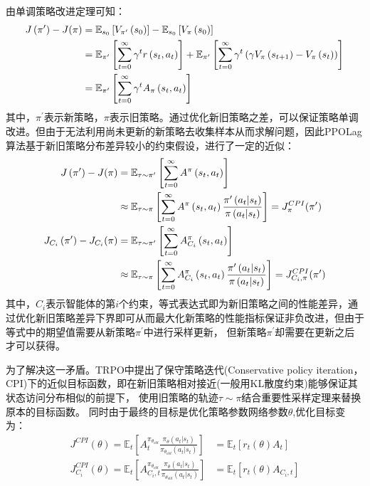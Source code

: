 由单调策略改进定理可知：
\begin{align}
    J\left(\pi^{\prime}\right)-J(\pi) & =\mathbb{E}_{s_{0}}\left[V_{\pi^{\prime}}\left(s_{0}\right)\right]-\mathbb{E}_{s_{0}}\left[V_{\pi}\left(s_{0}\right)\right] \\ \notag
    & =\mathbb{E}_{\pi^{\prime}}\left[\sum_{t=0}^{\infty} \gamma^{t} r\left(s_{t}, a_{t}\right)\right]+\mathbb{E}_{\pi^{\prime}}\left[\sum_{t=0}^{\infty} \gamma^{t}\left(\gamma V_{\pi}\left(s_{t+1}\right)-V_{\pi}\left(s_{t}\right)\right)\right] \\ \notag
    & = \mathbb{E}_{\pi^{\prime}}\left[\sum_{t=0}^{\infty} \gamma^{t} A_{\pi}\left(s_{t}, a_{t}\right)\right] \notag
\end{align}
其中，$\pi^{\prime}$表示新策略，$\pi$表示旧策略。通过优化新旧策略之差，可以保证策略单调改进。但由于无法利用尚未更新的新策略去收集样本从而求解问题，因此PPOLag算法基于新旧策略分布差异较小的约束假设，进行了一定的近似：
\begin{align}
    J\left(\pi^{\prime}\right)-J(\pi)
    &=  \mathbb{E}_{\tau \sim \pi^{\prime}}\left[\sum_{t=0}^{\infty} A^{\pi}\left(s_{t}, a_{t}\right) \right]\\ \notag
    &\approx \mathbb{E}_{\tau \sim \pi}\left[\sum_{t=0}^{\infty} A^{\pi}\left(s_{t}, a_{t}\right) \frac{\pi^{\prime}\left(a_{t}|s_{t}\right)}{\pi\left(a_{t}|s_{t}\right)}\right]=J_{\pi}^{CPI}(\pi^{\prime})\\
    J_{C_{i}}\left(\pi^{\prime}\right)-J_{C_{i}}(\pi)
    &=  \mathbb{E}_{\tau \sim \pi^{\prime}}\left[\sum_{t=0}^{\infty} A_{C_{i}}^{\pi}\left(s_{t}, a_{t}\right) \right]\\ \notag
    &\approx \mathbb{E}_{\tau \sim \pi}\left[\sum_{t=0}^{\infty} A_{C_{i}}^{\pi}\left(s_{t}, a_{t}\right) \frac{\pi^{\prime}\left(a_{t}|s_{t}\right)}{\pi\left(a_{t}|s_{t}\right)}\right]=J_{C_{i},\pi}^{CPI}(\pi^{\prime})
\end{align}
其中，$C_{i}$表示智能体的第$i$个约束，等式表达式即为新旧策略之间的性能差异，通过优化新旧策略差异下界即可从而最大化新策略的性能指标保证非负改进，但由于等式中的期望值需要从新策略$\pi^{\prime}$中进行采样更新，
但新策略$\pi^{\prime}$却需要在更新之后才可以获得。

为了解决这一矛盾。TRPO中提出了保守策略迭代(Conservative policy iteration，CPI)下的近似目标函数，即在新旧策略相对接近(一般用KL散度约束)能够保证其状态访问分布相似的前提下，
使用旧策略的轨迹$\tau \sim \pi$结合重要性采样定理来替换原本的目标函数。
同时由于最终的目标是优化策略参数网络参数$\theta$,优化目标变为：
\begin{align}
    J^{CPI}(\theta) = \mathbb{E}_{t}\left[ A_{t}^{\pi_{\theta_{old}}} \frac{\pi_{\theta}\left(a_{t}|s_{t}\right)}{\pi_{\theta_{old}}\left(a_{t}|s_{t}\right)}\right] & = \mathbb{E}_{t}\left[r_{t}(\theta)A_{t}\right]\\
    J_{C_{i}}^{CPI}(\theta) = \mathbb{E}_{t}\left[ A_{C_{i},t}^{\pi_{\theta_{old}}} \frac{\pi_{\theta}\left(a_{t}|s_{t}\right)}{\pi_{\theta_{old}}\left(a_{t}|s_{t}\right)}\right] & = \mathbb{E}_{t}\left[r_{t}(\theta)A_{C_{i},t}\right]
\end{align}


